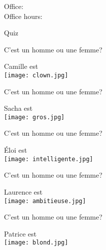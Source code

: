 \documentclass{beamer}
\subtitle[Traits et questions]{Encore les traits et les questions}
\begin{document}
  \begin{frame}
    \titlepage
    \tiny{Office: \\
          Office hours: }
  \end{frame}

  \begin{frame}{}
    \begin{center}
      \Large Quiz
    \end{center}
  \end{frame}

  \begin{frame}{C'est un homme ou une femme?}
    \begin{center}
      Camille est \underline{} \\
      \texttt{[image: clown.jpg]}
    \end{center}
  \end{frame}

  \begin{frame}{C'est un homme ou une femme?}
    \begin{center}
      Sacha est \underline{} \\
      \texttt{[image: gros.jpg]}
    \end{center}
  \end{frame}

  \begin{frame}{C'est un homme ou une femme?}
    \begin{center}
      Éloi est \underline{} \\
      \texttt{[image: intelligente.jpg]}
    \end{center}
  \end{frame}

  \begin{frame}{C'est un homme ou une femme?}
    \begin{center}
      Laurence est \underline{} \\
      \texttt{[image: ambitieuse.jpg]}
    \end{center}
  \end{frame}

  \begin{frame}{C'est un homme ou une femme?}
    \begin{center}
      Patrice est \underline{} \\
      \texttt{[image: blond.jpg]}
    \end{center}
  \end{frame}
\end{document}
